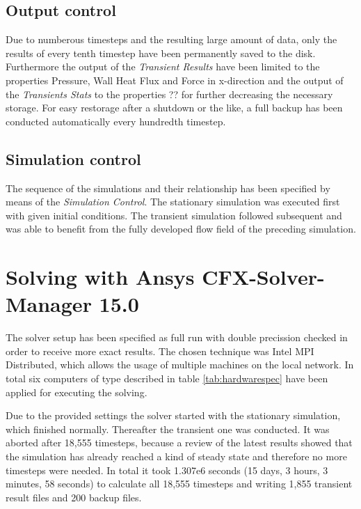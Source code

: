 \subsection{Output control}
Due to numberous timesteps and the resulting large amount of data, only the results of every tenth timestep have been permanently saved to the disk. Furthermore the output of the \emph{Transient Results} have been limited to the properties Pressure, Wall Heat Flux and Force in x-direction and the output of the \emph{Transients Stats} to the properties ?? for further decreasing the necessary storage.
For easy restorage after a shutdown or the like, a full backup has been conducted automatically every hundredth timestep.
\subsection{Simulation control}
The sequence of the simulations and their relationship has been specified by means of the \emph{Simulation Control}. The stationary simulation was executed first with given initial conditions. The transient simulation followed subsequent and was able to benefit from the fully developed flow field of the preceding simulation.
\section{Solving with Ansys CFX-Solver-Manager 15.0}
The solver setup has been specified as full run with double precission checked in order to receive more exact results. The chosen technique was Intel MPI Distributed, which allows the usage of multiple machines on the local network. In total six computers of type described in table \ref{tab:hardwarespec} have been applied for executing the solving.

Due to the provided settings the solver started with the stationary simulation, which finished normally. Thereafter the transient one was conducted. It was aborted after 18,555 timesteps, because a review of the latest results showed that the simulation has already reached a kind of steady state and therefore no more timesteps were needed. In total it took 1.307e6 seconds (15 days, 3 hours, 3 minutes, 58 seconds) to calculate all 18,555 timesteps and writing 1,855 transient result files and 200 backup files.